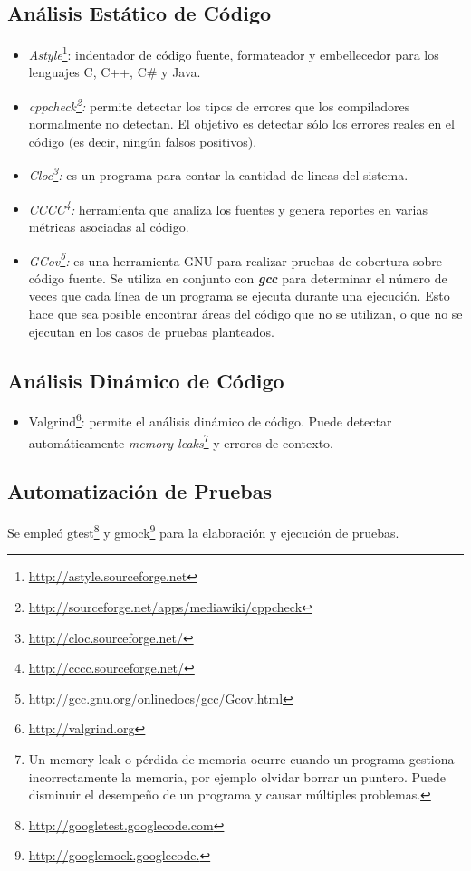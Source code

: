 \subsection{Análisis Estático de Código}
\begin{itemize}
 \item \emph{Astyle}\footnote{\url{http://astyle.sourceforge.net}}: indentador de código fuente, formateador y embellecedor para los lenguajes C, C++, C\# y Java.

 \item \emph{cppcheck\footnote{\url{http://sourceforge.net/apps/mediawiki/cppcheck}}:} permite detectar los tipos de errores que los compiladores normalmente no detectan. El objetivo es detectar sólo los errores reales en el código (es decir, ningún falsos positivos).

\item \emph{Cloc\footnote{\url{http://cloc.sourceforge.net/}}:} es un programa para contar la cantidad de lineas del sistema.

\item \emph{CCCC\footnote{\url{http://cccc.sourceforge.net/}}:} herramienta que analiza los fuentes y genera reportes en varias métricas asociadas al código.

\item \emph{GCov\footnote{http://gcc.gnu.org/onlinedocs/gcc/Gcov.html}:} es una herramienta GNU para realizar pruebas de cobertura sobre código fuente. Se utiliza en conjunto con \textbf{\textit{gcc}} para determinar el número de veces que cada línea de un programa se ejecuta durante una ejecución. Esto hace que sea posible encontrar áreas del código que no se utilizan, o que no se ejecutan en los casos de pruebas planteados.

\end{itemize}

\subsection{Análisis Dinámico de Código}
\begin{itemize}
	\item Valgrind\footnote{\url{http://valgrind.org}}: permite el análisis dinámico de código. Puede detectar automáticamente \emph{memory leaks}\footnote{Un memory leak o pérdida de memoria ocurre cuando un programa gestiona incorrectamente la memoria, por ejemplo olvidar borrar un puntero. Puede disminuir el desempeño de un programa y causar múltiples problemas.} y errores de contexto.
\end{itemize}

\subsection{Automatización de Pruebas}
Se empleó gtest\footnote{\url{http://googletest.googlecode.com}} y gmock\footnote{\url{http://googlemock.googlecode.}} para la elaboración y ejecución de pruebas.